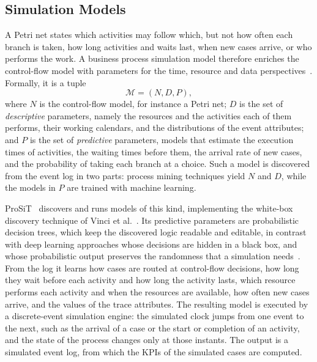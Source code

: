     \subsection{Simulation Models}
    \label{subsec:bg:simulation:model}
    A Petri net states which activities may follow which, but not how often each
    branch is taken, how long activities and waits last, when new cases arrive,
    or who performs the work. A business process simulation model therefore
    enriches the control-flow model with parameters for the time, resource and
    data perspectives~\cite{vinci2025online}. Formally, it is a tuple
    \begin{equation}
    \mathcal{M} = (N, D, P),
    \label{eq:bg:sim:bpsmodel}
    \end{equation}
    where $N$ is the control-flow model, for instance a Petri net; $D$ is the set
    of \emph{descriptive} parameters, namely the resources and the activities each
    of them performs, their working calendars, and the distributions of the event
    attributes; and $P$ is the set of \emph{predictive} parameters, models that
    estimate the execution times of activities, the waiting times before them,
    the arrival rate of new cases, and the probability of taking each branch at a
    choice. Such a model is discovered from the event log in
    two parts: process mining techniques yield $N$ and $D$, while the models in $P$
    are trained with machine learning.
    
    ProSiT~\cite{vinci2025prosit} discovers and runs models of this kind,
    implementing the white-box discovery technique of Vinci et
    al.~\cite{vinci2025reliable}. Its predictive parameters are probabilistic
    decision trees, which keep the
    discovered logic readable and editable, in contrast with deep learning
    approaches whose decisions are hidden in a black box, and whose probabilistic
    output preserves the randomness that a simulation
    needs~\cite{vinci2025online}. From the log it learns how cases are routed at
    control-flow decisions, how long they wait before each activity and how long
    the activity lasts, which resource performs each activity and when the
    resources are available, how often new cases arrive, and the values of the
    trace attributes. The resulting model is executed
    by a discrete-event simulation engine: the simulated
    clock jumps from one event to the next, such as the arrival of a case or the
    start or completion of an activity, and the state of the process changes only
    at those instants. The output is a simulated event log, from which the KPIs
    of the simulated cases are computed.
    
